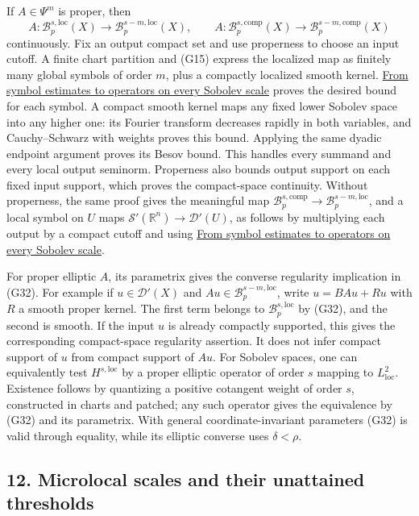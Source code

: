 \documentclass[
  11pt,
]{article}
\begin{document}
If \(A\in\Psi^m\) is proper, then \[
A:\mathcal B^{s,\mathrm{loc}}_p(X)\to\mathcal B^{s-m,\mathrm{loc}}_p(X),
\qquad
A:\mathcal B^{s,\mathrm{comp}}_p(X)\to\mathcal B^{s-m,\mathrm{comp}}_p(X)
\tag{G32}
\] continuously. Fix an output compact set and use properness to choose
an input cutoff. A finite chart partition and (G15) express the
localized map as finitely many global symbols of order \(m\), plus a
compactly localized smooth kernel.
\href{euclidean-symbol-calculus.pdf}{From symbol estimates to operators
on every Sobolev scale} proves the desired bound for each symbol. A
compact smooth kernel maps any fixed lower Sobolev space into any higher
one: its Fourier transform decreases rapidly in both variables, and
Cauchy--Schwarz with weights proves this bound. Applying the same dyadic
endpoint argument proves its Besov bound. This handles every summand and
every local output seminorm. Properness also bounds output support on
each fixed input support, which proves the compact-space continuity.
Without properness, the same proof gives the meaningful map
\(\mathcal B^{s,\mathrm{comp}}_p\to\mathcal B^{s-m,\mathrm{loc}}_p\),
and a local symbol on \(U\) maps
\(\mathcal S'(\mathbb R^n)\to\mathcal D'(U)\), as follows by multiplying
each output by a compact cutoff and using
\href{euclidean-symbol-calculus.pdf}{From symbol estimates to operators
on every Sobolev scale}.

For proper elliptic \(A\), its parametrix gives the converse regularity
implication in (G32). For example if \(u\in\mathcal D'(X)\) and
\(Au\in\mathcal B^{s-m,\mathrm{loc}}_p\), write \(u=BAu+Ru\) with \(R\)
a smooth proper kernel. The first term belongs to
\(\mathcal B^{s,\mathrm{loc}}_p\) by (G32), and the second is smooth. If
the input \(u\) is already compactly supported, this gives the
corresponding compact-space regularity assertion. It does not infer
compact support of \(u\) from compact support of \(Au\). For Sobolev
spaces, one can equivalently test \(H^{s,\mathrm{loc}}\) by a proper
elliptic operator of order \(s\) mapping to \(L^2_{\mathrm{loc}}\).
Existence follows by quantizing a positive cotangent weight of order
\(s\), constructed in charts and patched; any such operator gives the
equivalence by (G32) and its parametrix. With general
coordinate-invariant parameters (G32) is valid through equality, while
its elliptic converse uses \(\delta<\rho\).

\subsection{12. Microlocal scales and their unattained
thresholds}\label{microlocal-scales-and-their-unattained-thresholds}
\end{document}
